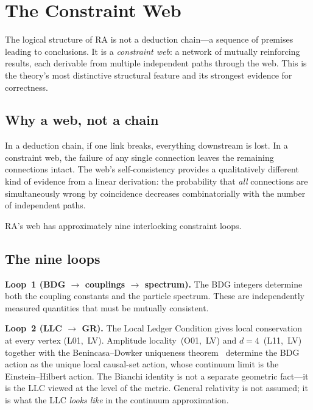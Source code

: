 \documentclass[11pt,a4paper]{article}
\theoremstyle{plain}
\theoremstyle{definition}
\theoremstyle{remark}
\begin{document}
\section{The Constraint Web}\label{sec:web}

The logical structure of RA is not a deduction chain---a sequence of premises
leading to conclusions.  It is a \emph{constraint web}: a network of mutually
reinforcing results, each derivable from multiple independent paths through the
web.  This is the theory's most distinctive structural feature and its strongest
evidence for correctness.

\subsection{Why a web, not a chain}\label{sec:web-chain}

In a deduction chain, if one link breaks, everything downstream is lost.  In a
constraint web, the failure of any single connection leaves the remaining
connections intact.  The web's self-consistency provides a qualitatively
different kind of evidence from a linear derivation: the probability that
\emph{all} connections are simultaneously wrong by coincidence decreases
combinatorially with the number of independent paths.

RA's web has approximately nine interlocking constraint loops.

\subsection{The nine loops}\label{sec:loops}

\textbf{Loop~1 (BDG $\to$ couplings $\to$ spectrum).}
The BDG integers determine both the coupling constants and the particle
spectrum.  These are independently measured quantities that must be mutually
consistent.

\textbf{Loop~2 (LLC $\to$ GR).}
The Local Ledger Condition gives local conservation at every vertex (L01,~LV).
Amplitude locality~(O01,~LV) and $d=4$~(L11,~LV) together with the
Benincasa--Dowker uniqueness theorem~\cite{BenincasaDowker2010} determine the
BDG action as the unique local causal-set action, whose continuum limit is the
Einstein--Hilbert action.  The Bianchi identity is not a separate geometric
fact---it is the LLC viewed at the level of the metric.  General relativity is
not assumed; it is what the LLC \emph{looks like} in the continuum approximation.
\end{document}
